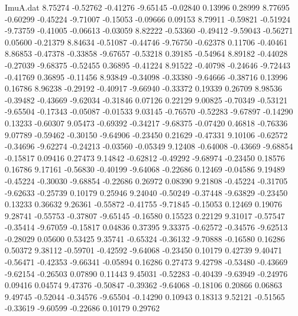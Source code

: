 \begin{filecontents}{ImuA.dat}
   8.75274   -0.52762   -0.41276   -9.65145   -0.02840    0.13996    0.28999
   8.77695   -0.60299   -0.45224   -9.71007   -0.15053   -0.09666    0.09153
   8.79911   -0.59821   -0.51924   -9.73759   -0.41005   -0.06613   -0.03059
   8.82222   -0.53360   -0.49412   -9.59043   -0.56271    0.05600   -0.21379
   8.84634   -0.51087   -0.44746   -9.76750   -0.62378    0.11706   -0.40461
   8.86853   -0.47378   -0.33858   -9.67657   -0.53218    0.39185   -0.54964
   8.89182   -0.44028   -0.27039   -9.68375   -0.52455    0.36895   -0.41224
   8.91522   -0.40798   -0.24646   -9.72443   -0.41769    0.36895   -0.11456
   8.93849   -0.34098   -0.33380   -9.64666   -0.38716    0.13996    0.16786
   8.96238   -0.29192   -0.40917   -9.66940   -0.33372    0.19339    0.26709
   8.98536   -0.39482   -0.43669   -9.62034   -0.31846    0.07126    0.22129
   9.00825   -0.70349   -0.53121   -9.65504   -0.17343   -0.05087   -0.01533
   9.03145   -0.76570   -0.52283   -9.67897   -0.14290    0.13233   -0.60307
   9.05473   -0.69392   -0.34217   -9.68375   -0.07420    0.46818   -0.76336
   9.07789   -0.59462   -0.30150   -9.64906   -0.23450    0.21629   -0.47331
   9.10106   -0.62572   -0.34696   -9.62274   -0.24213   -0.03560   -0.05349
   9.12408   -0.64008   -0.43669   -9.68854   -0.15817    0.09416    0.27473
   9.14842   -0.62812   -0.49292   -9.68974   -0.23450    0.18576    0.16786
   9.17161   -0.56830   -0.40199   -9.64068   -0.22686    0.12469   -0.04586
   9.19489   -0.45224   -0.30030   -9.68854   -0.22686    0.26972    0.08390
   9.21808   -0.45224   -0.31705   -9.62633   -0.25739    0.10179    0.25946
   9.24040   -0.50249   -0.37448   -9.63829   -0.23450    0.13233    0.36632
   9.26361   -0.55872   -0.41755   -9.71845   -0.15053    0.12469    0.19076
   9.28741   -0.55753   -0.37807   -9.65145   -0.16580    0.15523    0.22129
   9.31017   -0.57547   -0.35414   -9.67059   -0.15817    0.04836    0.37395
   9.33375   -0.62572   -0.34576   -9.62513   -0.28029    0.05600    0.53425
   9.35741   -0.65324   -0.36132   -9.70888   -0.16580    0.16286    0.50372
   9.38112   -0.59701   -0.42592   -9.64068   -0.23450    0.10179    0.42739
   9.40471   -0.56471   -0.42353   -9.66341   -0.05894    0.16286    0.27473
   9.42798   -0.53480   -0.43669   -9.62154   -0.26503    0.07890    0.11443
   9.45031   -0.52283   -0.40439   -9.63949   -0.24976    0.09416    0.04574
   9.47376   -0.50847   -0.39362   -9.64068   -0.18106    0.20866    0.06863
   9.49745   -0.52044   -0.34576   -9.65504   -0.14290    0.10943    0.18313
   9.52121   -0.51565   -0.33619   -9.60599   -0.22686    0.10179    0.29762

\end{filecontents}
